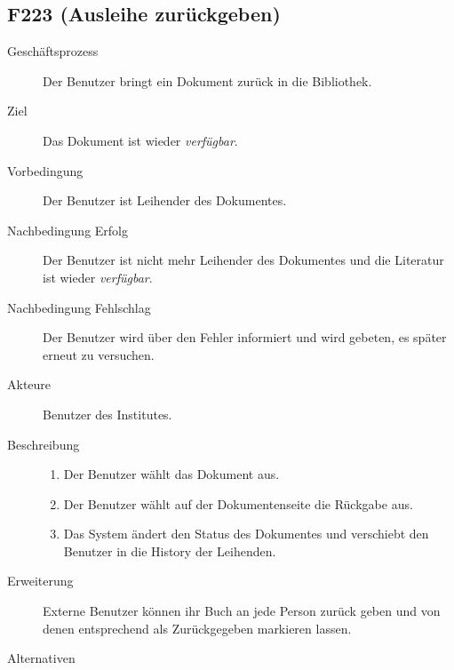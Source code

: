 \subsection{F223 (Ausleihe zurückgeben)}
\begin{description}
  \item[Geschäftsprozess]Der Benutzer bringt ein Dokument zurück in die Bibliothek.
  \item[Ziel]Das Dokument ist wieder \emph{verfügbar}.
  \item[Vorbedingung]Der Benutzer ist Leihender des Dokumentes.
  \item[Nachbedingung Erfolg]Der Benutzer ist nicht mehr Leihender des Dokumentes und die Literatur ist wieder \emph{verfügbar}.
  \item[Nachbedingung Fehlschlag]Der Benutzer wird über den Fehler informiert und wird gebeten, es später erneut zu versuchen.
  \item[Akteure]Benutzer des Institutes.
  \item[Beschreibung]\hfill
    \begin{enumerate}
      \item Der Benutzer wählt das Dokument aus.
      \item Der Benutzer wählt auf der Dokumentenseite die Rückgabe aus.
      \item Das System ändert den Status des Dokumentes und verschiebt den Benutzer in die History der Leihenden.
    \end{enumerate}
  \item[Erweiterung]Externe Benutzer können ihr Buch an jede Person zurück geben und von denen entsprechend als Zurückgegeben markieren lassen.
  \item[Alternativen]
\end{description}

